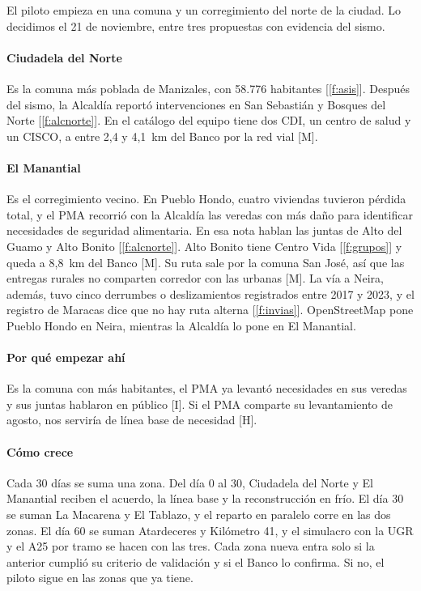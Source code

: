 \documentclass[11pt,letterpaper,parskip=half-]{scrartcl}
\newcommand{\marca}[1]{\textcolor{ceniza}{\footnotesize[#1]}}   %
\newcommand{\cf}[1]{\textcolor{tinta}{[\ref{#1}]}}                %
\begin{document}
El piloto empieza en una comuna y un corregimiento del norte de la ciudad. Lo decidimos el 21 de noviembre, entre tres propuestas con evidencia del sismo.

\paragraph{Ciudadela del Norte} Es la comuna más poblada de Manizales, con 58.776 habitantes \cf{f:asis}. Después del sismo, la Alcaldía reportó intervenciones en San Sebastián y Bosques del Norte \cf{f:alcnorte}. En el catálogo del equipo tiene dos CDI, un centro de salud y un CISCO, a entre 2,4 y 4,1~km del Banco por la red vial \marca{M}.

\paragraph{El Manantial} Es el corregimiento vecino. En Pueblo Hondo, cuatro viviendas tuvieron pérdida total, y el PMA recorrió con la Alcaldía las veredas con más daño para identificar necesidades de seguridad alimentaria. En esa nota hablan las juntas de Alto del Guamo y Alto Bonito \cf{f:alcnorte}. Alto Bonito tiene Centro Vida \cf{f:grupos} y queda a 8,8~km del Banco \marca{M}. Su ruta sale por la comuna San José, así que las entregas rurales no comparten corredor con las urbanas \marca{M}. La vía a Neira, además, tuvo cinco derrumbes o deslizamientos registrados entre 2017 y 2023, y el registro de Maracas dice que no hay ruta alterna \cf{f:invias}. OpenStreetMap pone Pueblo Hondo en Neira, mientras la Alcaldía lo pone en El Manantial.

\paragraph{Por qué empezar ahí} Es la comuna con más habitantes, el PMA ya levantó necesidades en sus veredas y sus juntas hablaron en público \marca{I}. Si el PMA comparte su levantamiento de agosto, nos serviría de línea base de necesidad \marca{H}.

\paragraph{Cómo crece} Cada 30 días se suma una zona. Del día 0 al 30, Ciudadela del Norte y El Manantial reciben el acuerdo, la línea base y la reconstrucción en frío. El día 30 se suman La Macarena y El Tablazo, y el reparto en paralelo corre en las dos zonas. El día 60 se suman Atardeceres y Kilómetro 41, y el simulacro con la UGR y el A25 por tramo se hacen con las tres. Cada zona nueva entra solo si la anterior cumplió su criterio de validación y si el Banco lo confirma. Si no, el piloto sigue en las zonas que ya tiene.
\end{document}
